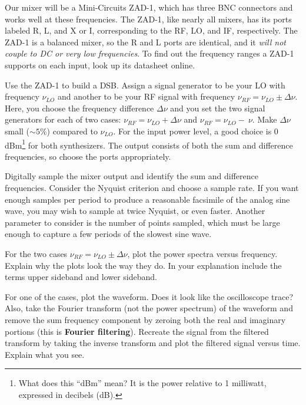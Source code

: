 \documentclass[11pt,preprint]{aastex}
\begin{document}
Our mixer will be a Mini-Circuits ZAD-1, which has three BNC connectors
and works well at these frequencies.  The ZAD-1,
like nearly all mixers, has its ports labeled R, L, and X or I, corresponding to
the RF, LO, and IF, respectively.
The ZAD-1 is a
balanced mixer, so the R and L ports are identical, and it
{\it will not couple to DC or very low frequencies}.  To find out
the frequency ranges a ZAD-1 supports on each input, 
look up its datasheet online. 


Use the ZAD-1 to build a DSB.
Assign a signal generator to
be your LO with frequency $\nu_{LO}$ and
another to be your RF signal with frequency $\nu_{RF} = \nu_{LO} \pm
\Delta \nu$.  Here, you choose the frequency difference $\Delta \nu$ and
you set the two signal generators 
for each of two cases:
$\nu_{RF} = \nu_{LO} + \Delta \nu$ and $\nu_{RF} = \nu_{LO} - \
\nu$.  Make $\Delta \nu$ small ($\sim5$\%) compared to $\nu_{LO}$.
For the input power level, a good choice is 0
dBm\footnote{What does this ``dBm'' mean? It is the power relative to 1
  milliwatt, expressed in decibels (dB).}
  for both synthesizers. The output consists of both the
sum and difference frequencies, so choose the ports appropriately.

Digitally sample the mixer output and identify the
sum and difference frequencies.
Consider
the Nyquist criterion and choose a sample rate. If you want enough samples per period to
produce a reasonable facsimile of the analog sine wave,
you may wish to sample at twice
Nyquist, or even faster.  Another parameter to consider is the number of points
sampled, which must be large enough to capture a few
periods of the slowest sine wave.

For the two cases $\nu_{RF} = \nu_{LO} \pm \Delta \nu$, plot the power
spectra versus frequency. Explain why the plots look the way they do. In
your explanation include the terms upper sideband and lower
sideband.

For one of the cases, plot the waveform.  Does it look like the
oscilloscope trace? Also, take the Fourier transform (not the power
spectrum) of the waveform and remove the sum frequency component by
zeroing both the real and imaginary portions (this is {\bf Fourier
filtering}).  Recreate the signal from the filtered transform by taking
the inverse transform and plot the filtered signal versus time.  Explain
what you see.
\end{document}
